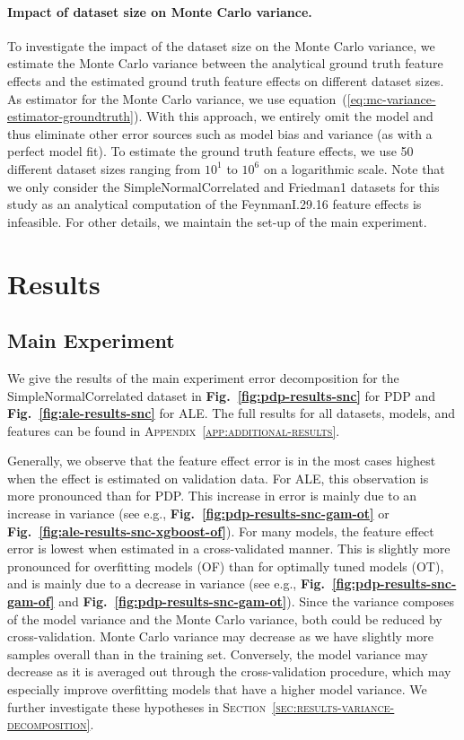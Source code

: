 \documentclass[runningheads]{llncs}
\begin{document}
\paragraph{Impact of dataset size on Monte Carlo variance.} To investigate the impact of the dataset size on the Monte Carlo variance, we
estimate the Monte Carlo variance between the analytical ground truth feature
effects and the estimated ground truth feature effects on different dataset
sizes. As estimator for the Monte Carlo variance, we use
equation~(\ref{eq:mc-variance-estimator-groundtruth}). With this approach, we
entirely omit the model and thus eliminate other error sources such as model
bias and variance (as with a perfect model fit). To estimate the ground truth
feature effects, we use 50 different dataset sizes ranging from $10^1$ to
$10^6$ on a logarithmic scale. Note that we only consider the
SimpleNormalCorrelated and Friedman1 datasets for this study as an analytical
computation of the FeynmanI.29.16 feature effects is infeasible. For other
details, we maintain the set-up of the main experiment.

\section{Results}\label{sec:results}

\subsection{Main Experiment}

We give the results of the main experiment error decomposition for the SimpleNormalCorrelated
dataset in \textbf{Fig.\@~\ref{fig:pdp-results-snc}} for PDP and \textbf{Fig.\@~\ref{fig:ale-results-snc}}
for ALE. The full results for all datasets, models, and features can be found in  %
\textsc{Appendix~\ref{app:additional-results}}.

Generally, we observe that the feature effect error is in the most cases highest when
the effect is estimated on validation data. For ALE, this observation is more pronounced
than for PDP. This increase in error is mainly due to an increase in variance (see e.g.,  %
\textbf{Fig.\@~\ref{fig:pdp-results-snc-gam-ot}} or \textbf{Fig.\@~\ref{fig:ale-results-snc-xgboost-of}}).
For many models, the feature effect error is lowest when estimated in a cross-validated manner.
This is slightly more pronounced for overfitting models (OF) than for optimally tuned models (OT),
and is mainly due to a decrease in variance (see e.g., \textbf{Fig.\@~\ref{fig:pdp-results-snc-gam-of}}
and \textbf{Fig.\@~\ref{fig:pdp-results-snc-gam-ot}}). Since the variance composes of the model variance
and the Monte Carlo variance, both could be reduced by cross-validation. Monte Carlo variance
may decrease as we have slightly more samples overall than in the training set. Conversely,
the model variance may decrease as it is averaged out through the cross-validation procedure,
which may especially improve overfitting models that have a higher model variance.
We further investigate these hypotheses in \textsc{Section~\ref{sec:results-variance-decomposition}}.
\end{document}
